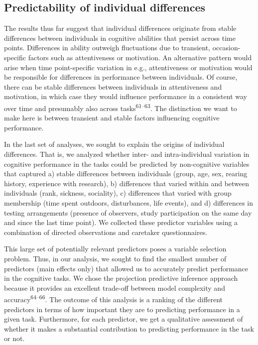 \documentclass[
  man,floatsintext]{apa6}
\begin{document}
\hypertarget{predictability-of-individual-differences}{%
\subsection{Predictability of individual differences}\label{predictability-of-individual-differences}}

The results thus far suggest that individual differences originate from stable differences between individuals in cognitive abilities that persist across time points. Differences in ability outweigh fluctuations due to transient, occasion-specific factors such as attentiveness or motivation. An alternative pattern would arise when time point-specific variation in e.g., attentiveness or motivation would be responsible for differences in performance between individuals. Of course, there can be stable differences between individuals in attentiveness and motivation, in which case they would influence performance in a consistent way over time and presumably also across tasks\textsuperscript{61--63}. The distinction we want to make here is between transient and stable factors influencing cognitive performance.

In the last set of analyses, we sought to explain the origins of individual differences. That is, we analyzed whether inter- and intra-individual variation in cognitive performance in the tasks could be predicted by non-cognitive variables that captured a) stable differences between individuals (group, age, sex, rearing history, experience with research), b) differences that varied within and between individuals (rank, sickness, sociality), c) differences that varied with group membership (time spent outdoors, disturbances, life events), and d) differences in testing arrangements (presence of observers, study participation on the same day and since the last time point). We collected these predictor variables using a combination of directed observations and caretaker questionnaires.

This large set of potentially relevant predictors poses a variable selection problem. Thus, in our analysis, we sought to find the smallest number of predictors (main effects only) that allowed us to accurately predict performance in the cognitive tasks. We chose the projection predictive inference approach because it provides an excellent trade-off between model complexity and accuracy\textsuperscript{64--66}. The outcome of this analysis is a ranking of the different predictors in terms of how important they are to predicting performance in a given task. Furthermore, for each predictor, we get a qualitative assessment of whether it makes a substantial contribution to predicting performance in the task or not.
\end{document}
